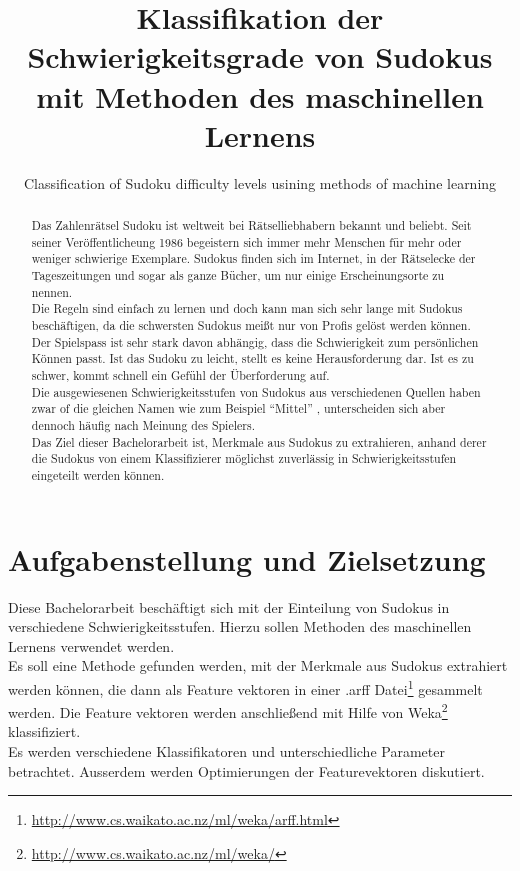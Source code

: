 \documentclass[accentcolor=tud6b,11pt,paper=a4]{tudreport}
\title{Klassifikation der Schwierigkeitsgrade von Sudokus mit Methoden des maschinellen Lernens}
\subtitle{Classification of Sudoku difficulty levels usining methods of machine learning}
\begin{document}
\maketitle

\begin{abstract}
Das Zahlenrätsel Sudoku ist weltweit bei Rätselliebhabern bekannt und beliebt. Seit seiner Veröffentlicheung 1986 begeistern sich immer mehr Menschen für mehr oder weniger schwierige Exemplare. Sudokus finden sich im Internet, in der Rätselecke der Tageszeitungen und sogar als ganze Bücher, um nur einige Erscheinungsorte zu nennen. \\
Die Regeln sind einfach zu lernen und doch kann man sich sehr lange mit Sudokus beschäftigen, da die schwersten Sudokus meißt nur von Profis gelöst werden können.\\
Der Spielspass ist sehr stark davon abhängig, dass die Schwierigkeit zum persönlichen Können passt. Ist das Sudoku zu leicht, stellt es keine Herausforderung dar. Ist es zu schwer, kommt schnell ein Gefühl der Überforderung auf. \\
Die ausgewiesenen Schwierigkeitsstufen von Sudokus aus verschiedenen Quellen haben zwar of die gleichen Namen wie zum Beispiel 
\textquotedblleft Mittel\textquotedblright
, unterscheiden sich aber dennoch häufig nach Meinung des Spielers.\\
Das Ziel dieser Bachelorarbeit ist, Merkmale aus Sudokus zu extrahieren, anhand derer die Sudokus von einem Klassifizierer möglichst zuverlässig in Schwierigkeitsstufen eingeteilt werden können.\\
\end{abstract}

\tableofcontents

\chapter{Aufgabenstellung und Zielsetzung}
Diese Bachelorarbeit beschäftigt sich mit der Einteilung von Sudokus in verschiedene Schwierigkeitsstufen. Hierzu sollen Methoden des maschinellen Lernens verwendet werden. \\ Es soll eine Methode gefunden werden, mit der Merkmale aus Sudokus extrahiert werden können, die dann als Feature vektoren in einer .arff Datei\footnote{\url{http://www.cs.waikato.ac.nz/ml/weka/arff.html}} gesammelt werden. Die Feature vektoren werden anschließend mit Hilfe von Weka\footnote{\url{http://www.cs.waikato.ac.nz/ml/weka/}} klassifiziert.\\
Es werden verschiedene Klassifikatoren und unterschiedliche Parameter betrachtet. Ausserdem werden Optimierungen der Featurevektoren diskutiert.
\end{document}
